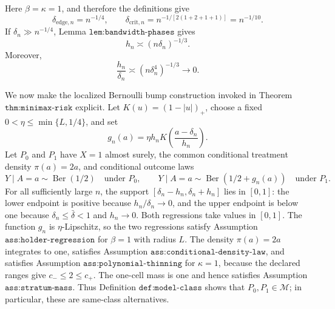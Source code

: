 Here \(\beta=\kappa=1\), and therefore the definitions give
\[
 \delta_{\mathrm{edge},n}=n^{-1/4},
 \qquad
 \delta_{\mathrm{crit},n}
 =n^{-1/[2(1+2+1+1)]}=n^{-1/10}.
\]
If \(\delta_n\gg n^{-1/4}\), Lemma \(\texttt{lem:bandwidth-phases}\) gives
\[
 h_n\asymp(n\delta_n)^{-1/3}.
\]
Moreover,
\[
 \frac{h_n}{\delta_n}
 \asymp(n\delta_n^4)^{-1/3}\longrightarrow0.
\]

We now make the localized Bernoulli bump construction invoked in Theorem \(\texttt{thm:minimax-risk}\) explicit.  Let \(K(u)=(1-|u|)_+\), choose a fixed \(0<\eta\leq\min\{L,1/4\}\), and set
\[
 g_n(a)=\eta h_nK\left(\frac{a-\delta_n}{h_n}\right).
\]
Let \(P_0\) and \(P_1\) have \(X=1\) almost surely, the common conditional treatment density \(\pi(a)=2a\), and conditional outcome laws
\[
 Y\mid A=a\sim\operatorname{Ber}(1/2)
 \quad\text{under }P_0,
 \qquad
 Y\mid A=a\sim\operatorname{Ber}(1/2+g_n(a))
 \quad\text{under }P_1.
\]
For all sufficiently large \(n\), the support \([\delta_n-h_n,\delta_n+h_n]\) lies in \([0,1]\): the lower endpoint is positive because \(h_n/\delta_n\to0\), and the upper endpoint is below one because \(\delta_n\leq\bar\delta<1\) and \(h_n\to0\).  Both regressions take values in \([0,1]\).  The function \(g_n\) is \(\eta\)-Lipschitz, so the two regressions satisfy Assumption \(\texttt{ass:holder-regression}\) for \(\beta=1\) with radius \(L\).  The density \(\pi(a)=2a\) integrates to one, satisfies Assumption \(\texttt{ass:conditional-density-law}\), and satisfies Assumption \(\texttt{ass:polynomial-thinning}\) for \(\kappa=1\), because the declared ranges give \(c_-\leq2\leq c_+\).  The one-cell mass is one and hence satisfies Assumption \(\texttt{ass:stratum-mass}\).  Thus Definition \(\texttt{def:model-class}\) shows that \(P_0,P_1\in\mathcal M\); in particular, these are same-class alternatives.

